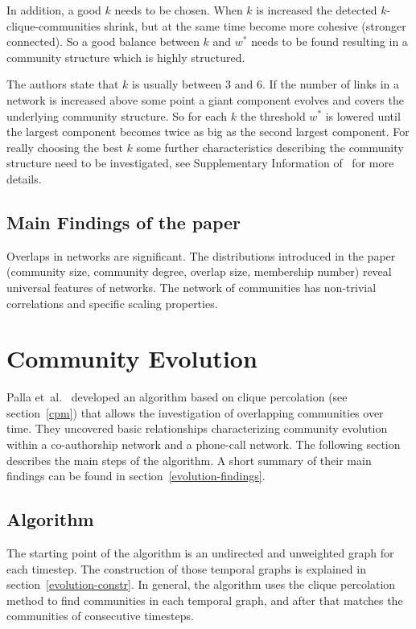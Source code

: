 \documentclass[runningheads,a4paper]{llncs}
\begin{document}
In addition, a good $k$ needs to be chosen. When $k$ is increased the detected $k$-clique-communities shrink, but at the same time become more cohesive (stronger connected).
So a good balance between $k$ and $w^*$ needs to be found resulting in a community structure which is highly structured.

The authors state that $k$ is usually between $3$ and $6$.
If the number of links in a network is increased above some point a giant component evolves and covers the underlying community structure.
So for each $k$ the threshold $w^*$ is lowered until the largest component becomes twice as big as the second largest component. For really choosing the best $k$ some further characteristics describing the community structure need to be investigated, see Supplementary Information of~\cite{palla2005uncovering} for more details.

\subsection{Main Findings of the paper}
Overlaps in networks are significant. The distributions introduced in the paper (community size, community degree, overlap size, membership number) reveal universal features of networks. The network of communities has non-trivial correlations and specific scaling properties.~\cite{palla2005uncovering}

\section{Community Evolution}
\label{evolution}
Palla et~al.~\cite{palla2007quantifying} developed an algorithm based on clique percolation (see section~\ref{cpm}) that allows the investigation of overlapping communities over time. They uncovered basic relationships characterizing community evolution within a co-authorship network and a phone-call network. The following section describes the main steps of the algorithm. A short summary of their main findings can be found in section~\ref{evolution-findings}.

\subsection{Algorithm}
\label{evolution-algo}
The starting point of the algorithm is an undirected and unweighted graph for each timestep.
The construction of those temporal graphs is explained in section~\ref{evolution-constr}.
In general, the algorithm uses the clique percolation method to find communities in each temporal graph, and after that matches the communities of consecutive timesteps.
\end{document}
